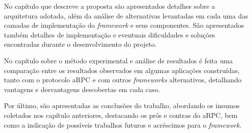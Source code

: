 No capítulo que descreve a proposta são apresentados detalhes sobre a arquitetura adotada, além da análise de alternativas levantadas em cada uma das camadas de implementação do \textit{framework} e seus componentes. São apresentados também detalhes de implementação e eventuais dificuldades e soluções encontradas durante o desenvolvimento do projeto.

No capítulo sobre o método experimental e análise de resultados é feita uma comparação entre os resultados observados em algumas aplicações construídas, tanto com o protocolo aRPC e com outros \textit{frameworks} alternativos, detalhando vantagens e desvantagens descobertas em cada caso.

Por último, são apresentadas as conclusões do trabalho, abordando os insumos coletados nos capítulo anteriores, destacando os prós e contras do aRPC, bem como  a indicação de possíveis trabalhos futuros e acréscimos para o \textit{framework}.

\bigskip
